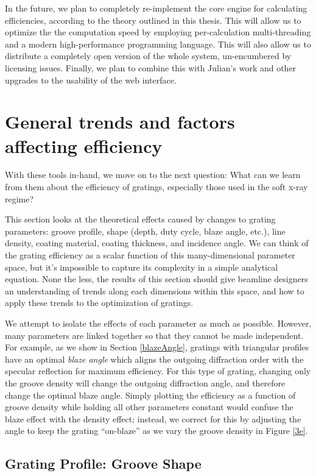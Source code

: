 In the future, we plan to completely re-implement the core engine for calculating efficiencies, according to the theory outlined in this thesis.  This will allow us to optimize the the computation speed by employing per-calculation multi-threading and a modern high-performance programming language.  This will also allow us to distribute a completely open version of the whole system, un-encumbered by licensing issues.  Finally, we plan to combine this with Julian's work and other upgrades to the usability of the web interface.

\section{General trends and factors affecting efficiency}
With these tools in-hand, we move on to the next question: What can we learn from them about the efficiency of gratings, especially those used in the soft x-ray regime?

This section looks at the theoretical effects caused by changes to grating parameters: groove profile, shape (depth, duty cycle, blaze angle, etc.), line density, coating material, coating thickness, and incidence angle.  We can think of the grating efficiency as a scalar function of this many-dimensional parameter space, but it's impossible to capture its complexity in a simple analytical equation.  None the less, the results of this section should give beamline designers an understanding of trends along each dimensions within this space, and how to apply these trends to the optimization of gratings.

We attempt to isolate the effects of each parameter as much as possible.  However, many parameters are linked together so that they cannot be made independent.  For example, as we show in Section \ref{blazeAngle}, gratings with triangular profiles have an optimal \emph{blaze angle} which aligns the outgoing diffraction order with the specular reflection for maximum efficiency.  For this type of grating, changing only the groove density will change the outgoing diffraction angle, and therefore change the optimal blaze angle.  Simply plotting the efficiency as a function of groove density while holding all other parameters constant would confuse the blaze effect with the density effect; instead, we correct for this by adjusting the angle to keep the grating ``on-blaze'' as we vary the groove density in Figure \ref{3e}.

\subsection{Grating Profile: Groove Shape}

